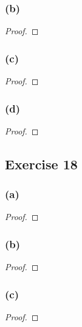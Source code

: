 \documentclass[14pt]{extarticle}
\begin{document}
\subsubsection{(b)}

\begin{proof}

\end{proof}

\subsubsection{(c)}

\begin{proof}

\end{proof}

\subsubsection{(d)}

\begin{proof}

\end{proof}

\subsection{Exercise 18}

\subsubsection{(a)}

\begin{proof}

\end{proof}

\subsubsection{(b)}

\begin{proof}

\end{proof}

\subsubsection{(c)}

\begin{proof}

\end{proof}
\end{document}
